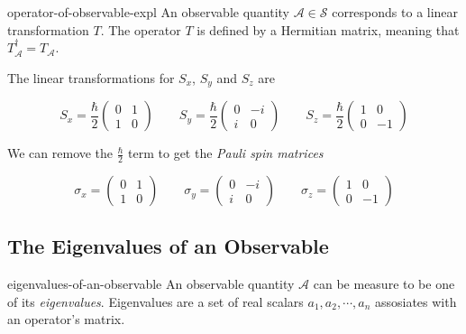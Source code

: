 \documentclass[preview]{standalone}
\begin{document}
\begin{snippet}{operator-of-observable-expl}
    An observable quantity \(\mathcal{A} \in \mathscr{S}\) corresponds to a linear
    transformation \(T\). The operator \(T\) is defined by a Hermitian matrix, meaning that
    \(T_\mathcal{A}^{\dagger}=T_\mathcal{A}\).

    The linear transformations for \(S_x\), \(S_y\) and \(S_z\) are

    \[
        S_x = \frac{\hbar}{2}
        \begin{pmatrix}
            0 & 1 \\
            1 & 0
        \end{pmatrix}
        \quad\quad
        S_y = \frac{\hbar}{2}
        \begin{pmatrix}
            0 & -i \\
            i & 0
        \end{pmatrix}
        \quad\quad
        S_z = \frac{\hbar}{2}
        \begin{pmatrix}
            1 & 0 \\
            0 & -1
        \end{pmatrix}
    \]

    We can remove the \(\frac{\hbar}{2}\) term to get the \textit{Pauli spin matrices}

    \[
        \sigma_x =
        \begin{pmatrix}
            0 & 1 \\
            1 & 0
        \end{pmatrix}
        \quad\quad
        \sigma_y =
        \begin{pmatrix}
            0 & -i \\
            i & 0
        \end{pmatrix}
        \quad\quad
        \sigma_z =
        \begin{pmatrix}
            1 & 0 \\
            0 & -1
        \end{pmatrix}
    \]
\end{snippet}

\subsection{The Eigenvalues of an Observable}

\begin{snippet}{eigenvalues-of-an-observable}
    An observable quantity \(\mathcal{A}\) can be measure to be one of its \textit{eigenvalues}.
    Eigenvalues are a set of real scalars \(a_1, a_2, \cdots , a_n\) assosiates with
    an operator's matrix.
\end{snippet}
\end{document}
